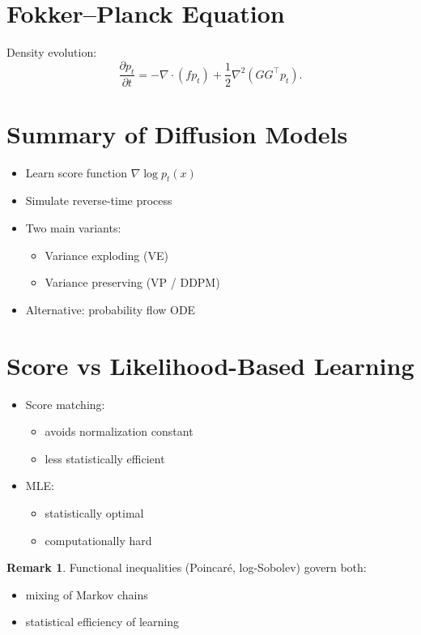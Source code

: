 \documentclass[12pt,oneside]{book}
\numberwithin{equation}{section}
\theoremstyle{definition}
\newtheorem{remark}{Remark}[section]
\theoremstyle{plain}
\theoremstyle{remark}
\begin{document}
\section{Fokker--Planck Equation}

Density evolution:
\[
\frac{\partial p_t}{\partial t}
=
- \nabla \cdot (f p_t)
+
\frac{1}{2} \nabla^2 (G G^\top p_t).
\]

\section{Summary of Diffusion Models}

\begin{itemize}
    \item Learn score function $\nabla \log p_t(x)$
    \item Simulate reverse-time process
    \item Two main variants:
    \begin{itemize}
        \item Variance exploding (VE)
        \item Variance preserving (VP / DDPM)
    \end{itemize}
    \item Alternative: probability flow ODE
\end{itemize}

\section{Score vs Likelihood-Based Learning}

\begin{itemize}
    \item Score matching:
    \begin{itemize}
        \item avoids normalization constant
        \item less statistically efficient
    \end{itemize}
    
    \item MLE:
    \begin{itemize}
        \item statistically optimal
        \item computationally hard
    \end{itemize}
\end{itemize}

\begin{remark}
Functional inequalities (Poincaré, log-Sobolev) govern both:
\begin{itemize}
    \item mixing of Markov chains
    \item statistical efficiency of learning
\end{itemize}
\end{remark}
\end{document}
